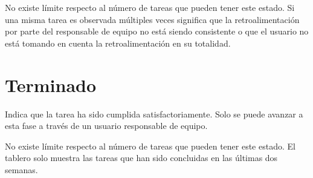 \documentclass[
  letterpaper,
  DIV=11,
  numbers=noendperiod]{scrreprt}
\begin{document}
No existe límite respecto al número de tareas que pueden tener este
estado. Si una misma tarea es observada múltiples veces significa que la
retroalimentación por parte del responsable de equipo no está siendo
consistente o que el usuario no está tomando en cuenta la
retroalimentación en su totalidad.

\hypertarget{terminado}{%
\section{Terminado}\label{terminado}}

Indica que la tarea ha sido cumplida satisfactoriamente. Solo se puede
avanzar a esta fase a través de un usuario responsable de equipo.

No existe límite respecto al número de tareas que pueden tener este
estado. El tablero solo muestra las tareas que han sido concluidas en
las últimas dos semanas.
\end{document}
